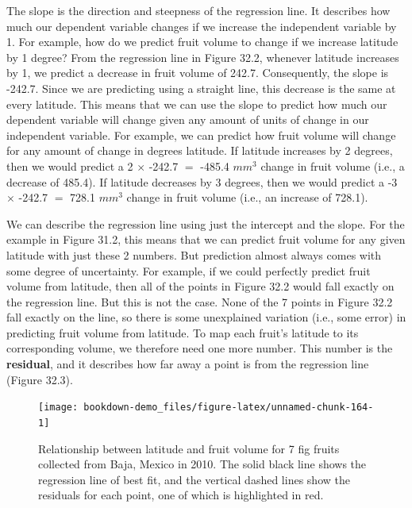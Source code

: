 \documentclass[
]{scrbook}
\begin{document}
The slope is the direction and steepness of the regression line.
It describes how much our dependent variable changes if we increase the independent variable by 1.
For example, how do we predict fruit volume to change if we increase latitude by 1 degree?
From the regression line in Figure 32.2, whenever latitude increases by 1, we predict a decrease in fruit volume of 242.7.
Consequently, the slope is -242.7.
Since we are predicting using a straight line, this decrease is the same at every latitude.
This means that we can use the slope to predict how much our dependent variable will change given any amount of units of change in our independent variable.
For example, we can predict how fruit volume will change for any amount of change in degrees latitude.
If latitude increases by 2 degrees, then we would predict a 2 \(\times\) -242.7 \(=\) -485.4 \(mm^{3}\) change in fruit volume (i.e., a decrease of 485.4).
If latitude decreases by 3 degrees, then we would predict a -3 \(\times\) -242.7 \(=\) 728.1 \(mm^{3}\) change in fruit volume (i.e., an increase of 728.1).

We can describe the regression line using just the intercept and the slope.
For the example in Figure 31.2, this means that we can predict fruit volume for any given latitude with just these 2 numbers.
But prediction almost always comes with some degree of uncertainty.
For example, if we could perfectly predict fruit volume from latitude, then all of the points in Figure 32.2 would fall exactly on the regression line.
But this is not the case.
None of the 7 points in Figure 32.2 fall exactly on the line, so there is some unexplained variation (i.e., some error) in predicting fruit volume from latitude.
To map each fruit's latitude to its corresponding volume, we therefore need one more number.
This number is the \textbf{residual}, and it describes how far away a point is from the regression line (Figure 32.3).

\begin{figure}
\texttt{[image: bookdown-demo\_files/figure-latex/unnamed-chunk-164-1]} \caption{Relationship between latitude and fruit volume for 7 fig fruits collected from Baja, Mexico in 2010. The solid black line shows the regression line of best fit, and the vertical dashed lines show the residuals for each point, one of which is highlighted in red.}\label{fig:unnamed-chunk-164}
\end{figure}
\end{document}
